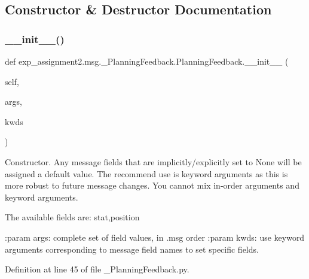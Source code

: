 \subsection{Constructor \& Destructor Documentation}
\mbox{\label{classexp__assignment2_1_1msg_1_1__PlanningFeedback_1_1PlanningFeedback_a412b2dd1816a388daf353cf71191b283}} 
\subsubsection{\texorpdfstring{\+\_\+\+\_\+init\+\_\+\+\_\+()}{\_\_init\_\_()}}
{\footnotesize\ttfamily def exp\+\_\+assignment2.\+msg.\+\_\+\+Planning\+Feedback.\+Planning\+Feedback.\+\_\+\+\_\+init\+\_\+\+\_\+ (\begin{DoxyParamCaption}\item[{}]{self,  }\item[{}]{args,  }\item[{}]{kwds }\end{DoxyParamCaption})}

\begin{DoxyVerb}Constructor. Any message fields that are implicitly/explicitly
set to None will be assigned a default value. The recommend
use is keyword arguments as this is more robust to future message
changes.  You cannot mix in-order arguments and keyword arguments.

The available fields are:
   stat,position

:param args: complete set of field values, in .msg order
:param kwds: use keyword arguments corresponding to message field names
to set specific fields.
\end{DoxyVerb}
 

Definition at line 45 of file \+\_\+\+Planning\+Feedback.\+py.


